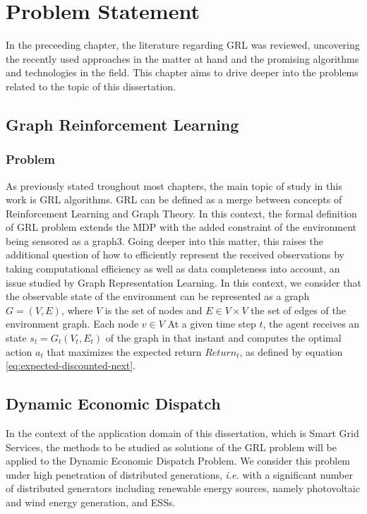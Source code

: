 \chapter{Problem Statement} \label{chap:problem-statement}
In the preceeding chapter, the literature regarding \ac {GRL} was reviewed, uncovering the recently used approaches in the matter at hand and the promising algorithms and technologies in the field.  This chapter aims to drive deeper into the problems related to the topic of this dissertation. 

\section{Graph Reinforcement Learning}

\subsection{Problem}

As previously stated troughout most chapters, the main topic of study in this work is \acf{GRL} algorithms. \ac{GRL}  can be defined as a merge between concepts of Reinforcement Learning and Graph Theory. In this context, the formal definition of \ac{GRL} problem extends the \ac{MDP} with the added constraint of the environment being sensored as a graph3. Going deeper into this matter, this raises the additional question of how to efficiently represent the received observations by taking computational efficiency as well as data completeness into account, an issue studied by Graph Representation Learning. 
In this context, we consider that the observable state of the environment can be represented as a graph $G = (V, E)$, where $V$ is the set of nodes and $E \in V \times V$ the set of edges of the environment graph. Each node $v \in V$ At a given time step $t$, the agent receives an state $s_t = G_t(V_t, E_t)$ of the graph in that instant and computes the optimal action $a_t$ that maximizes the expected return $Return_t$, as defined by equation \ref{eq:expected-discounted-next}.




\section{Dynamic Economic Dispatch}

In the context of the application domain of this dissertation, which is Smart Grid Services, the methods to be studied as solutions of the \ac{GRL} problem will be applied to the Dynamic Economic Dispatch Problem. We consider this problem under high penetration of distributed generations, \textit{i.e.} with a significant number of distributed generators including renewable energy sources, namely photovoltaic and wind energy generation, and \acp{ESS}. 

